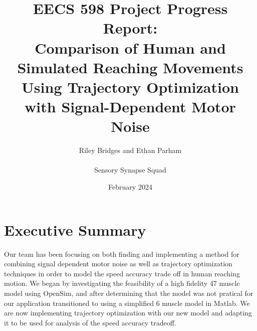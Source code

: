 \documentclass[table,12pt]{article}
\title{\textbf{EECS 598 Project Progress Report:} \\
    Comparison of Human and Simulated Reaching Movements Using Trajectory Optimization with Signal-Dependent Motor Noise}
\author{Riley Bridges and Ethan Parham \\\\
    Sensory Synapse Squad}
\date{February 2024}
\begin{document}
\maketitle
\section{Executive Summary}
Our team has been focusing on both finding and implementing a method for combining signal dependent motor noise as well as trajectory optimization techniques in order to model the speed accuracy trade off in human reaching motion. We began by investigating the feasibility of a high fidelity 47 muscle model using OpenSim, and after determining that the model was not pratical for our application transitioned to using a simplified 6 muscle model in Matlab. We are now implementing trajectory optimization with our new model and adapting it to be used for analysis of the speed accuracy tradeoff.
\newpage
\end{document}
